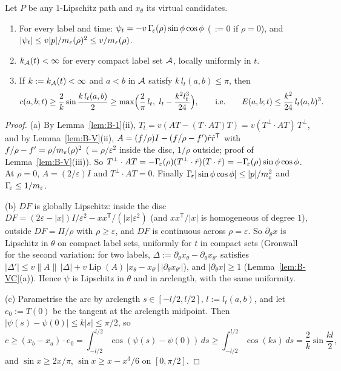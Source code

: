 \begin{lemma}\label{lem:ST-D0}
Let $P$ be any $1$-Lipschitz path and $x_\theta$ its virtual candidates.
\begin{enumerate}
\item[(a)] For every label and time: $\psi_t=-v\,\Gamma_{\!\varepsilon}(\rho)\sin\phi\cos\phi$ (\,$:=0$ if $\rho=0$), and
$|\psi_t|\le v|p|/m_\varepsilon(\rho)^2\le v/m_\varepsilon(\rho)$.
\item[(b)] $k_{\mathcal A}(t)<\infty$ for every compact label set $\mathcal A$, locally uniformly in $t$.
\item[(c)] If $k:=k_{\mathcal A}(t)<\infty$ and $a<b$ in $\mathcal A$ satisfy $k\,l_t(a,b)\le\pi$, then
\[
c(a,b;t)\ge\frac2k\sin\frac{k\,l_t(a,b)}2\ge\max\Bigl(\frac2\pi\,l_t,\ l_t-\frac{k^2l_t^3}{24}\Bigr),\qquad\text{i.e.}\qquad
E(a,b;t)\le\frac{k^2}{24}\,l_t(a,b)^3 .
\]
\end{enumerate}
\end{lemma}
\begin{proof}
(a) By Lemma~\ref{lem:B-1}(ii), $T_t=v(AT-(T\cdot AT)T)=v(T^\perp\cdot AT)\,T^\perp$, and by Lemma~\ref{lem:B-V}(ii),
$A=(f/\rho)I-(f/\rho-f')\hat r\hat r^{\mathsf T}$ with $f/\rho-f'=\rho/m_\varepsilon(\rho)^2$ ($=\rho/\varepsilon^2$ inside the disc, $1/\rho$
outside; proof of Lemma~\ref{lem:B-V}(iii)). So $T^\perp\cdot AT=-\Gamma_{\!\varepsilon}(\rho)(T^\perp\cdot\hat r)(T\cdot\hat r)=-\Gamma_{\!\varepsilon}(\rho)\sin\phi\cos\phi$.
At $\rho=0$, $A=(2/\varepsilon)I$ and $T^\perp\cdot AT=0$. Finally $\Gamma_{\!\varepsilon}|\sin\phi\cos\phi|\le|p|/m_\varepsilon^2$ and $\Gamma_{\!\varepsilon}\le1/m_\varepsilon$.

(b) $DF$ is globally Lipschitz: inside the disc $DF=(2\varepsilon-|x|)I/\varepsilon^2-xx^{\mathsf T}/(|x|\varepsilon^2)$ (and
$xx^{\mathsf T}/|x|$ is homogeneous of degree $1$), outside $DF=\Pi/\rho$ with $\rho\ge\varepsilon$, and $DF$ is continuous across
$\rho=\varepsilon$. So $\partial_\theta x$ is Lipschitz in $\theta$ on compact label sets, uniformly for $t$ in compact sets (Gronwall
for the second variation: for two labels, $\Delta:=\partial_\theta x_\theta-\partial_\theta x_{\theta'}$ satisfies
$|\Delta'|\le v\|A\|\,|\Delta|+v\operatorname{Lip}(A)\,|x_\theta-x_{\theta'}|\,|\partial_\theta x_{\theta'}|$), and
$|\partial_\theta x|\ge1$ (Lemma~\ref{lem:B-VC}(a)). Hence $\psi$ is Lipschitz in $\theta$ and in arclength, with the same uniformity.

(c) Parametrise the arc by arclength $s\in[-l/2,l/2]$, $l:=l_t(a,b)$, and let $e_0:=T(0)$ be the tangent at the arclength midpoint.
Then $|\psi(s)-\psi(0)|\le k|s|\le\pi/2$, so
\[
c\ge(x_b-x_a)\cdot e_0=\int_{-l/2}^{l/2}\cos(\psi(s)-\psi(0))\,ds\ge\int_{-l/2}^{l/2}\cos(ks)\,ds=\frac2k\sin\frac{kl}2,
\]
and $\sin x\ge2x/\pi$, $\sin x\ge x-x^3/6$ on $[0,\pi/2]$.
\end{proof}

